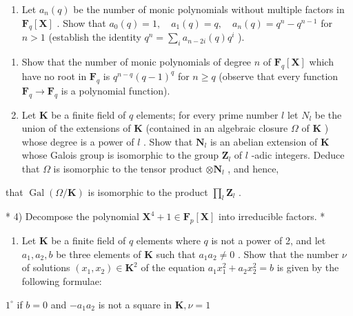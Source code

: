 \begin{enumerate}
\def\labelenumi{\alph{enumi})}
\setcounter{enumi}{3}
\tightlist
\item
  Let \(a_{n}(q)\) be the number of monic polynomials without multiple factors in \(\mathbf{F}_q[\mathbf{X}]\) . Show that \(a_0(q) = 1, \quad a_1(q) = q, \quad a_n(q) = q^n - q^{n-1}\) for \(n > 1\) (establish the identity \(q^n = \sum_i a_{n-2i}(q) q^i\) ).
\end{enumerate}

\begin{enumerate}
\def\labelenumi{\arabic{enumi})}
\setcounter{enumi}{1}
\item
  Show that the number of monic polynomials of degree \(n\) of \(\mathbf{F}_q[\mathbf{X}]\) which have no root in \(\mathbf{F}_q\) is \(q^{n - q}(q - 1)^q\) for \(n \geqslant q\) (observe that every function \(\mathbf{F}_q \to \mathbf{F}_q\) is a polynomial function).
\item
  Let \(\mathbf{K}\) be a finite field of \(q\) elements; for every prime number \(l\) let \(N_{l}\) be the union of the extensions of \(\mathbf{K}\) (contained in an algebraic closure \(\Omega\) of \(\mathbf{K}\) ) whose degree is a power of \(l\) . Show that \(\mathbf{N}_{l}\) is an abelian extension of \(\mathbf{K}\) whose Galois group is isomorphic to the group \(\mathbf{Z}_{l}\) of \(l\) -adic integers. Deduce that \(\Omega\) is isomorphic to the tensor product \(\otimes \mathbf{N}_{l}\) , and hence,
\end{enumerate}

that \(\operatorname{Gal}(\Omega / \mathbf{K})\) is isomorphic to the product \(\prod_{l} \mathbf{Z}_l\) .

* 4) Decompose the polynomial \(\mathbf{X}^4 + 1 \in \mathbf{F}_p[\mathbf{X}]\) into irreducible factors. *

\begin{enumerate}
\def\labelenumi{\arabic{enumi})}
\setcounter{enumi}{4}
\tightlist
\item
  Let \(\mathbf{K}\) be a finite field of \(q\) elements where \(q\) is not a power of 2, and let \(a_1, a_2, b\) be three elements of \(\mathbf{K}\) such that \(a_1a_2 \neq 0\) . Show that the number \(\nu\) of solutions \((x_1, x_2) \in \mathbf{K}^2\) of the equation \(a_1x_1^2 + a_2x_2^2 = b\) is given by the following formulae:
\end{enumerate}

\(1^{\circ}\) if \(b = 0\) and \(-a_{1}a_{2}\) is not a square in \(\mathbf{K},\nu = 1\)

